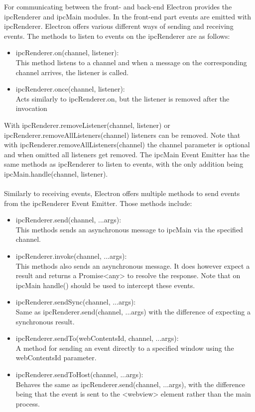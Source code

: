  
For communicating between the front- and back-end Electron provides the ipcRenderer and ipcMain modules.
In the front-end part events are emitted with ipcRenderer. 
Electron offers various different ways of sending and receiving events.
The methods to listen to events on the ipcRenderer are as follows: \parencite{electronDocs}
\begin{itemize}
    \item ipcRenderer.on(channel, listener):\\
    This method listens to a channel and when a message on the corresponding 
    channel arrives, the listener is called.
    \item ipcRenderer.once(channel, listener):\\
    Acts similarly to ipcRenderer.on, but the listener is removed after the invocation
\end{itemize}
With ipcRenderer.removeListener(channel, listener) or\\
 ipcRenderer.removeAllListeners(channel) listeners can be removed.
Note that with ipcRenderer.removeAllListeners(channel) the channel parameter is optional and when omitted
all listeners get removed.
The ipcMain Event Emitter has the same methods as ipcRenderer to 
listen to events, with the only addition being ipcMain.handle(channel, listener).\paragraph{}
Similarly to receiving events, Electron offers multiple methods to send events from the ipcRenderer Event Emitter. 
Those methods include: \parencite{electronDocs}
\begin{itemize}
    \item ipcRenderer.send(channel, ...args):\\
     This methods sends an asynchronous message to ipcMain via the specified channel. 
    \item ipcRenderer.invoke(channel, ...args):\\
    This methods also sends an asynchronous message. 
    It does however expect a result and returns a Promise<any> to resolve the response.
    Note that on ipcMain handle() should be used to intercept these events.
    \item ipcRenderer.sendSync(channel, ...args):\\
     Same as ipcRenderer.send(channel, ...args) with the difference of 
    expecting a synchronous result.
    \item ipcRenderer.sendTo(webContentsId, channel, ...args):\\
    A method for sending an event directly to a specified window 
    using the webContentsId parameter.
    \item ipcRenderer.sendToHost(channel, ...args):\\
     Behaves the same as ipcRenderer.send(channel, ...args), with the 
    difference being that the event is sent to the <webview> element rather than the main process.
\end{itemize}
